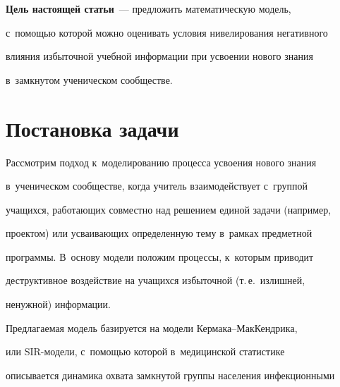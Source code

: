 {





} 


  


  \textbf{Цель настоящей статьи}~--- предложить математическую модель, 


с~по\-мощью которой можно оценивать условия нивелирования негативного 


влияния избыточной учебной информации при усвоении нового знания 


в~замк\-ну\-том ученическом сообществе.










\section{Постановка задачи}










  Рассмотрим подход к~моделированию процесса усвоения нового знания 


в~ученическом сообществе, когда учитель взаимодействует с~группой 


учащихся, ра\-бо\-та\-ющих со\-вмест\-но над решением единой задачи (например, 


проектом) или усва\-и\-ва\-ющих определенную тему в~рам\-ках предметной 


программы. В~основу модели положим процессы, к~которым приводит 


деструктивное воздействие на учащихся избыточной (т.\,е.\ излишней, 


не\-нуж\-ной) информации. 


  


  Предлагаемая модель базируется на модели Кер\-ма\-ка--Мак\-Кенд\-ри\-ка, 


или SIR-мо\-де\-ли, с~по\-мощью которой в~медицинской статистике 


описывается динамика охвата замк\-ну\-той группы населения инфекционными 


